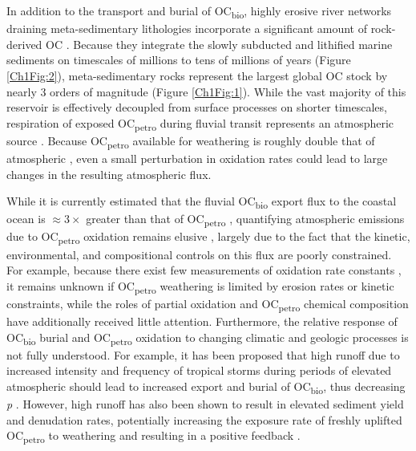 In addition to the transport and burial of OC\textsubscript{bio}, highly erosive river networks draining meta-sedimentary lithologies incorporate a significant amount of rock-derived OC \citep[OC\textsubscript{petro}; \textit{e.g.}][]{Hilton:2011jw,Galy:2015fx}. Because they integrate the slowly subducted and lithified marine sediments on timescales of millions to tens of millions of years (Figure \ref{Ch1Fig:2}), meta-sedimentary rocks represent the largest global OC stock by nearly $3$ orders of magnitude (Figure \ref{Ch1Fig:1}). While the vast majority of this reservoir is effectively decoupled from surface processes on shorter timescales, respiration of exposed OC\textsubscript{petro} during fluvial transit represents an atmospheric  source \citep{Galy:2008ff,Bouchez:2010if,Hilton:2014dh}. Because OC\textsubscript{petro} available for weathering is roughly double that of atmospheric  \citep[\textit{i.e.} 1100 PgC in the upper $1$ m;][]{Copard:2007bf}, even a small perturbation in oxidation rates could lead to large changes in the resulting atmospheric  flux. 

While it is currently estimated that the fluvial OC\textsubscript{bio} export flux to the coastal ocean is $\approx 3\times$ greater than that of OC\textsubscript{petro} \citep{Galy:2015fx}, quantifying atmospheric  emissions due to OC\textsubscript{petro} oxidation remains elusive \citep{Galy:2008ff,Bouchez:2010if,Hilton:2014dh}, largely due to the fact that the kinetic, environmental, and compositional controls on this flux are poorly constrained. For example, because there exist few measurements of oxidation rate constants \citep{Chang:1999vo}, it remains unknown if OC\textsubscript{petro} weathering is limited by erosion rates or kinetic constraints, while the roles of partial oxidation \citep{Schillawski:2008ko} and OC\textsubscript{petro} chemical composition \citep{Galy:2008ff} have additionally received little attention. Furthermore, the relative response of OC\textsubscript{bio} burial and OC\textsubscript{petro} oxidation to changing climatic and geologic processes is not fully understood. For example, it has been proposed that high runoff due to increased intensity and frequency of tropical storms during periods of elevated atmospheric  should lead to increased export and burial of OC\textsubscript{bio}, thus decreasing \textit{p} \citep[\textit{i.e.} a negative feedback loop;][]{Hilton:2008fo}. However, high runoff has also been shown to result in elevated sediment yield and denudation rates, potentially increasing the exposure rate of freshly uplifted OC\textsubscript{petro} to weathering and resulting in a positive feedback \citep{Hilton:2014dh}.

